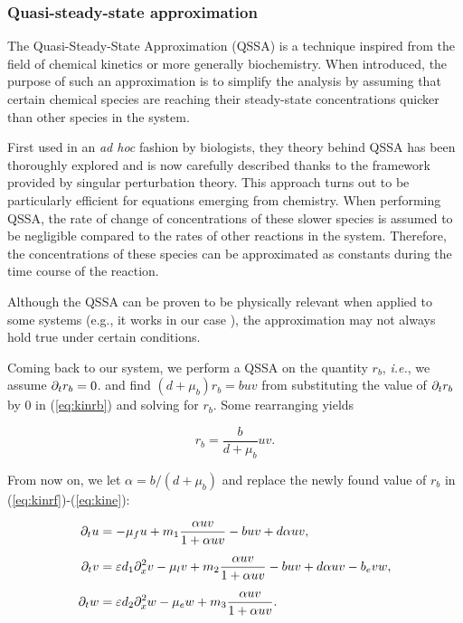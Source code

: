\subsubsection{Quasi-steady-state approximation}

The Quasi-Steady-State Approximation (QSSA) is a  technique inspired from the field of  chemical kinetics or more generally biochemistry. When introduced, the purpose of such an approximation is to simplify the analysis by assuming that certain chemical species are reaching their steady-state concentrations quicker than other species in the system.

First used in an \textit{ad hoc} fashion by biologists, they theory behind QSSA has been thoroughly explored and is now carefully described thanks to the framework provided by singular perturbation theory. This approach turns out to be particularly efficient for equations emerging from chemistry. When performing QSSA, the rate of change of concentrations of these slower species is assumed to be negligible compared to the rates of other reactions in the system. Therefore, the concentrations of these species can be approximated as constants during the time course of the reaction.

\begin{remark}
Although the QSSA can be proven to be physically relevant when applied to some systems (e.g., it works in our case ), the approximation may not always hold true under certain conditions.
\end{remark}

Coming back to our system, we perform a QSSA on the quantity $r_b$, \textit{i.e.}, we assume $\partial_t r_b = 0$. and find $(d + \mu_b) r_b = b u v $ from substituting the value of $\partial_t r_b$ by 0 in (\ref{eq:kinrb}) and solving for $r_b$. Some rearranging yields

$$r_b = \dfrac{b}{d + \mu_b} u v.$$

From now on, we let $\alpha = b / (d + \mu_b)$ and replace the newly found value of $r_b$ in (\ref{eq:kinrf})-(\ref{eq:kine}):

\begin{align}
    \partial_t u &= -\mu_f u + m_1 \dfrac{\alpha u v}{1 + \alpha u v} - b u v + d \alpha u v, \label{eq:kinu} \\[0.5em]
    \partial_t v &= \varepsilon d_1 \partial_x^2 v - \mu_l v + m_2 \dfrac{\alpha u v}{1 + \alpha u v} - b u v + d \alpha u v - b_e v w,  \label{eq:kinv}\\[0.5em]
    \partial_t w &= \varepsilon d_2 \partial_x^2 w - \mu_e w + m_3 \dfrac{\alpha u v}{1 + \alpha u v}. \label{eq:kinw}
\end{align}

